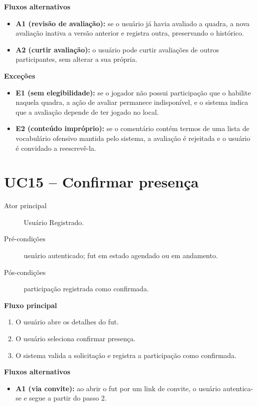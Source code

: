 \begin{apendicesenv}
        \noindent\textbf{Fluxos alternativos}
        \begin{itemize}
            \item \textbf{A1 (revisão de avaliação):} se o usuário já havia avaliado a quadra, a nova avaliação inativa a versão anterior e registra outra, preservando o histórico.
            \item \textbf{A2 (curtir avaliação):} o usuário pode curtir avaliações de outros participantes, sem alterar a sua própria.
        \end{itemize}

        \noindent\textbf{Exceções}
        \begin{itemize}
            \item \textbf{E1 (sem elegibilidade):} se o jogador não possui participação que o habilite naquela quadra, a ação de avaliar permanece indisponível, e o sistema indica que a avaliação depende de ter jogado no local.
            \item \textbf{E2 (conteúdo impróprio):} se o comentário contém termos de uma lista de vocabulário ofensivo mantida pelo sistema, a avaliação é rejeitada e o usuário é convidado a reescrevê-la.
        \end{itemize}

    \section*{UC15 -- Confirmar presença}
        \begin{description}
            \item[Ator principal] Usuário Registrado.
            \item[Pré-condições] usuário autenticado; fut em estado agendado ou em andamento.
            \item[Pós-condições] participação registrada como confirmada.
        \end{description}

        \noindent\textbf{Fluxo principal}
        \begin{enumerate}
            \item O usuário abre os detalhes do fut.
            \item O usuário seleciona confirmar presença.
            \item O sistema valida a solicitação e registra a participação como confirmada.
        \end{enumerate}

        \noindent\textbf{Fluxos alternativos}
        \begin{itemize}
            \item \textbf{A1 (via convite):} ao abrir o fut por um link de convite, o usuário autentica-se e segue a partir do passo 2.
        \end{itemize}


\end{apendicesenv}
